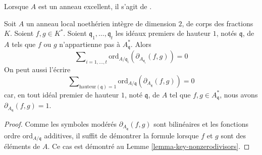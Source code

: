 \begin{lemma}
\label{lemma-milnor-gersten-low-degree}
\begin{reference}
Lorsque $A$ est un anneau excellent, il s'agit de \cite[Proposition 1]{Kato-Milnor-K}.
\end{reference}
Soit $A$ un anneau local noethérien intègre de dimension $2$, de corps des fractions $K$.
Soient $f, g \in K^*$.
Soient $\mathfrak q_1, \ldots, \mathfrak q_t$ les idéaux premiers de hauteur
$1$, notés $\mathfrak q$, de $A$ tels que $f$ ou $g$ n'appartienne pas à
$A^*_{\mathfrak q}$.
Alors
$$
\sum\nolimits_{i = 1, \ldots, t}
\text{ord}_{A/\mathfrak q_i}(\partial_{A_{\mathfrak q_i}}(f, g))
=
0
$$
On peut aussi l'écrire
$$
\sum\nolimits_{\text{hauteur}(\mathfrak q) = 1}
\text{ord}_{A/\mathfrak q}(\partial_{A_{\mathfrak q}}(f, g))
=
0
$$
car, en tout idéal premier de hauteur $1$, noté $\mathfrak q$,
de $A$ tel que $f, g \in A^*_{\mathfrak q}$,
nous avons $\partial_{A_{\mathfrak q}}(f, g) = 1$.
\end{lemma}

\begin{proof}
Comme les symboles modérés $\partial_{A_{\mathfrak q}}(f, g)$ sont
bilinéaires et les fonctions ordre $\text{ord}_{A/\mathfrak q}$
additives, il suffit de démontrer la formule lorsque
$f$ et $g$ sont des éléments de $A$. Ce cas est démontré au
Lemme \ref{lemma-key-nonzerodivisors}.
\end{proof}

